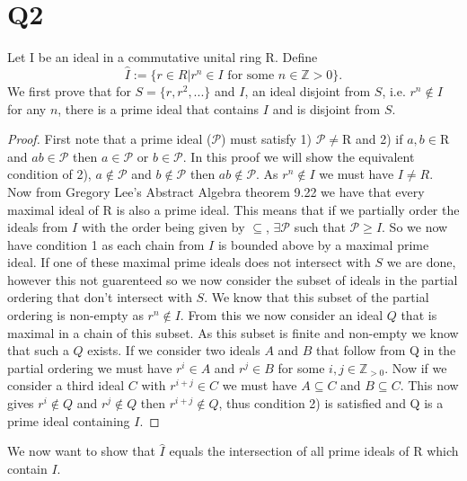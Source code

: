 \documentclass{article}
\theoremstyle{definition}
\begin{document}
\section*{Q2}
Let I be an ideal in a commutative unital ring R. Define
$$\hat{I}:= \{r \in R | r^n\in I \text{ for some } n\in\mathbb{Z}>0\}.$$
We first prove that for $S=\{r,r^2,...\}$ and $I$, an ideal disjoint from $S$, i.e. $r^n\notin I$ for any $n$, there is a prime ideal that contains $I$ and is disjoint from $S$.
\begin{proof}
First note that a prime ideal ($\mathcal{P}$) must satisfy 1) $\mathcal{P}\neq$R and 2) if $a,b\in$R and $ab\in\mathcal{P}$ then $a\in\mathcal{P}$ or $b\in\mathcal{P}$. In this proof we will show the equivalent condition of 2),  $a\notin\mathcal{P}$ and $b\notin\mathcal{P}$ then $ab\notin\mathcal{P}$. As $r^n\notin I$ we must have $I\neq R$. Now from Gregory Lee's Abstract Algebra theorem 9.22 we have that every maximal ideal of R is also a prime ideal. This means that if we partially order the ideals from $I$ with the order being given by $\subseteq$, $\exists\mathcal{P}$ such that $\mathcal{P}\geq I$. So we now have condition 1 as each chain from $I$ is bounded above by a maximal prime ideal. If one of these maximal prime ideals does not intersect with $S$ we are done, however this not guarenteed so we now consider the subset of ideals in the partial ordering that don't intersect with $S$. We know that this subset of the partial ordering is non-empty as $r^n\notin I$. From this we now consider an ideal $Q$ that is maximal in a chain of this subset. As this subset is finite and non-empty we know that such a $Q$ exists. If we consider two ideals $A$ and $B$ that follow from Q in the partial ordering we must have $r^i\in A$ and $r^j\in B$ for some $i,j\in\mathbb{Z}_{>0}$. Now if we consider a third ideal $C$ with $r^{i+j}\in C$ we must have $A\subseteq C$ and $B\subseteq C$. This now gives $r^i\notin Q$ and $r^j\notin Q$ then $r^{i+j}\notin Q$, thus condition 2) is satisfied and Q is a prime ideal containing $I$.
\end{proof}
\noindent We now want to show that $\hat{I}$ equals the intersection of all prime ideals of R which contain $I$.
\end{document}
